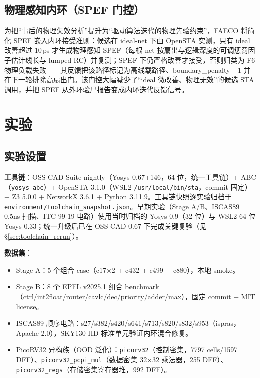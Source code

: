 \documentclass[journal]{IEEEtran}
\begin{document}
\subsection{物理感知内环（SPEF 门控）}

为把“事后的物理失效分析”提升为“驱动算法迭代的物理先验约束”，FAECO 将简化 SPEF 嵌入内环接受准则：候选在 ideal-net 下由 OpenSTA 实测，只有 ideal 改善超过 $10\,$ps 才生成物理感知 SPEF（每根 net 按扇出与逻辑深度的可调惩罚因子估计线长与 lumped RC）并复测；SPEF 下仍严格改善才接受，否则归类为 F6 物理负载失败——其反馈把该路径标记为高线载路径、boundary\_penalty $+1$ 并在下一轮排除高扇出门。该门控大幅减少了“ideal 微改善、物理无效”的候选 STA 调用，并把 SPEF 从外环验尸报告变成内环迭代反馈信号。
\section{实验}\label{sec:exp}

\subsection{实验设置}

\textbf{工具链}：OSS-CAD Suite nightly（Yosys 0.67+146，64 位，统一工具链）+ ABC（\texttt{yosys-abc}）+ OpenSTA 3.1.0（WSL2 \texttt{/usr/local/bin/sta}，commit 固定）+ Z3 5.0.0 + NetworkX 3.6.1 + Python 3.11.9。工具链快照逐实验归档于 \texttt{environment/toolchain\_snapshot.json}。早期实验（Stage A/B、ISCAS89 0.5ns 扫描、ITC-99 19 电路）使用当时归档的 Yosys 0.9（32 位）与 WSL2 64 位 Yosys 0.33；统一升级后已在 OSS-CAD 0.67 下完成关键复验（见 \S\ref{sec:toolchain_rerun}）。

\textbf{数据集}：
\begin{itemize}
  \item Stage A：5 个组合 case（c17$\times$2 + c432 + c499 + c880），本地 smoke。
  \item Stage B：8 个 EPFL v2025.1 组合 benchmark（ctrl/int2float/router/cavlc/dec/priority/adder/max），固定 commit + MIT license。
  \item ISCAS89 顺序电路：s27/s382/s420/s641/s713/s820/s832/s953（ispras，Apache-2.0），SKY130 HD 标准单元验证内环混合修复。
  \item PicoRV32 异构族（OOD 泛化）：\texttt{picorv32}（控制密集，7797 cells/1597 DFF）、\texttt{picorv32\_pcpi\_mul}（数据密集 32$\times$32 乘法器，255 DFF）、\texttt{picorv32\_regs}（存储密集寄存器堆，992 DFF）。
\end{itemize}
\end{document}
